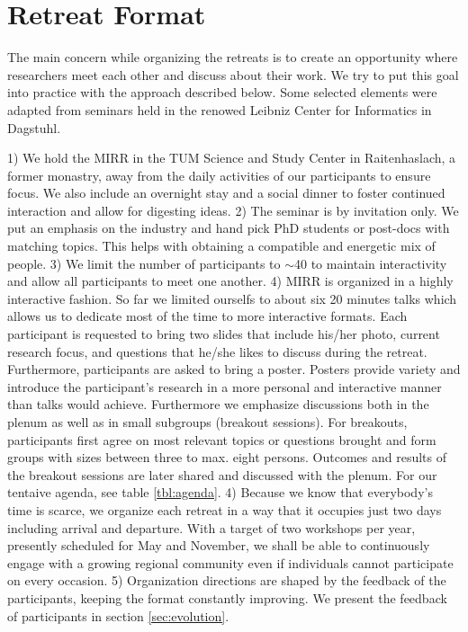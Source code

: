 \section{Retreat Format}

The main concern while organizing the retreats is to create an opportunity where researchers meet each other and discuss about their work. We try to put this goal into practice with the  approach described below. Some selected elements were adapted from seminars held in the renowed Leibniz Center for Informatics in Dagstuhl\cite{dagstuhl}.

1) We hold the MIRR in the \ac{TUM} Science and Study Center in Raitenhaslach, a former monastry, away from the daily activities of our participants to ensure focus. We also include an overnight stay and a social dinner to foster continued interaction and allow for digesting ideas.
2) The seminar is by invitation only. We put an emphasis on the industry and hand pick PhD students or post-docs with matching topics. This helps with obtaining a compatible and energetic mix of people.
3) We limit the number of participants to $\sim$40 to maintain interactivity and allow all
participants to meet one another.
4) MIRR is organized in a highly interactive fashion. So far we limited ourselfs to about six 20 minutes talks which allows us to dedicate most of the time to more interactive formats. Each participant is requested to bring two slides that include his/her photo, current research focus, and questions that he/she likes to discuss during the retreat. Furthermore, participants are asked to bring a poster. Posters provide variety and introduce the participant's research in a more personal and interactive manner than talks would achieve. Furthermore we emphasize discussions both in the plenum as well as in small subgroups (breakout sessions). For breakouts, participants first agree on most relevant topics or questions brought and form groups with sizes between three to max. eight persons. Outcomes and results of the breakout sessions are later shared and discussed with the plenum. For our tentaive agenda, see table \ref{tbl:agenda}.
4) Because we know that everybody's time is scarce, we organize each retreat in a way that it occupies just two days including arrival and departure.  With a target of two workshops per year, presently scheduled for May and November, we shall be able to continuously
engage with a growing regional community even if individuals cannot
participate on every occasion.
5) Organization directions are shaped by the feedback of the participants, keeping the format constantly improving. We present the feedback of participants in section \ref{sec:evolution}.


